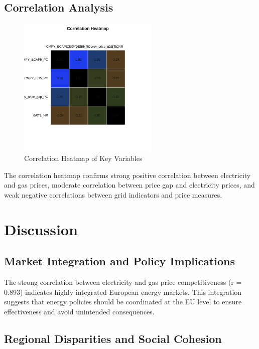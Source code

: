 \documentclass[11pt,a4paper]{article}
\begin{document}
\subsection{Correlation Analysis}

\begin{figure}[H]
\centering
\includegraphics[width=0.6\textwidth]{assets/fig_correlation_heatmap.svg}
\caption{Correlation Heatmap of Key Variables}
\label{fig:correlation_heatmap}
\end{figure}

The correlation heatmap confirms strong positive correlation between electricity and gas prices, moderate correlation between price gap and electricity prices, and weak negative correlations between grid indicators and price measures.

\section{Discussion}

\subsection{Market Integration and Policy Implications}

The strong correlation between electricity and gas price competitiveness (r = 0.893) indicates highly integrated European energy markets. This integration suggests that energy policies should be coordinated at the EU level to ensure effectiveness and avoid unintended consequences.

\subsection{Regional Disparities and Social Cohesion}
\end{document}
